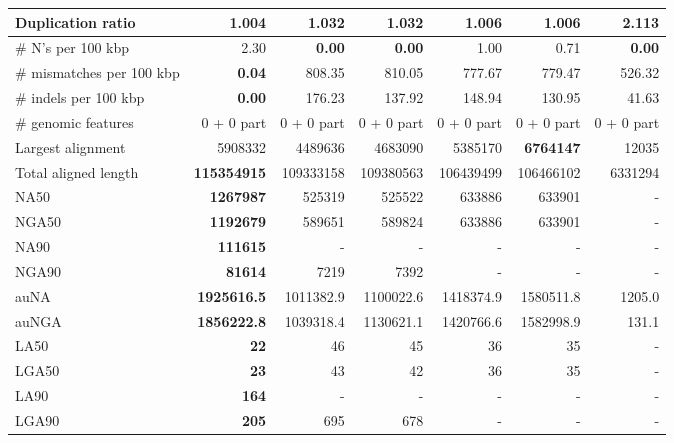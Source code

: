 \documentclass[12pt,a4paper]{article}
\begin{document}
\begin{table}[ht]
\begin{center}
\begin{tabular}{|l*{6}{|r}|}
Duplication ratio & {\bf 1.004} & 1.032 & 1.032 & 1.006 & 1.006 & 2.113 \\ \hline
\# N's per 100 kbp & 2.30 & {\bf 0.00} & {\bf 0.00} & 1.00 & 0.71 & {\bf 0.00} \\ \hline
\# mismatches per 100 kbp & {\bf 0.04} & 808.35 & 810.05 & 777.67 & 779.47 & 526.32 \\ \hline
\# indels per 100 kbp & {\bf 0.00} & 176.23 & 137.92 & 148.94 & 130.95 & 41.63 \\ \hline
\# genomic features & 0 + 0 part & 0 + 0 part & 0 + 0 part & 0 + 0 part & 0 + 0 part & 0 + 0 part \\ \hline
Largest alignment & 5908332 & 4489636 & 4683090 & 5385170 & {\bf 6764147} & 12035 \\ \hline
Total aligned length & {\bf 115354915} & 109333158 & 109380563 & 106439499 & 106466102 & 6331294 \\ \hline
NA50 & {\bf 1267987} & 525319 & 525522 & 633886 & 633901 & - \\ \hline
NGA50 & {\bf 1192679} & 589651 & 589824 & 633886 & 633901 & - \\ \hline
NA90 & {\bf 111615} & - & - & - & - & - \\ \hline
NGA90 & {\bf 81614} & 7219 & 7392 & - & - & - \\ \hline
auNA & {\bf 1925616.5} & 1011382.9 & 1100022.6 & 1418374.9 & 1580511.8 & 1205.0 \\ \hline
auNGA & {\bf 1856222.8} & 1039318.4 & 1130621.1 & 1420766.6 & 1582998.9 & 131.1 \\ \hline
LA50 & {\bf 22} & 46 & 45 & 36 & 35 & - \\ \hline
LGA50 & {\bf 23} & 43 & 42 & 36 & 35 & - \\ \hline
LA90 & {\bf 164} & - & - & - & - & - \\ \hline
LGA90 & {\bf 205} & 695 & 678 & - & - & - \\ \hline
\end{tabular}
\end{center}
\end{table}
\end{document}
